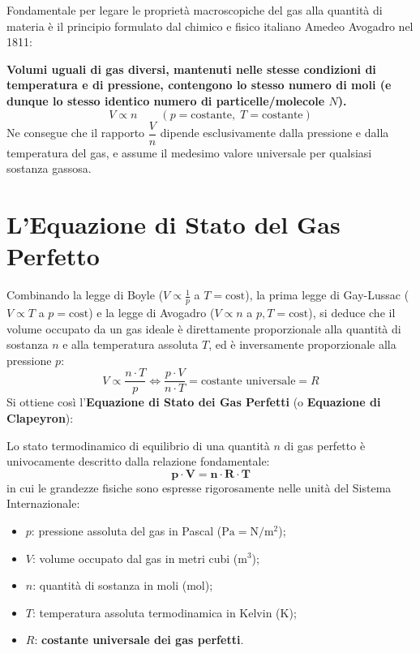 \documentclass[11pt,a4paper,oneside]{report}
\begin{document}
Fondamentale per legare le propriet\`a macroscopiche del gas alla quantit\`a di materia \`e il principio formulato dal chimico e fisico italiano Amedeo Avogadro nel 1811:

\begin{leggefisica}
\textbf{Volumi uguali di gas diversi, mantenuti nelle stesse condizioni di temperatura e di pressione, contengono lo stesso numero di moli (e dunque lo stesso identico numero di particelle/molecole $N$).}
\[
V \propto n \qquad (p = \text{costante}, \; T = \text{costante})
\]
Ne consegue che il rapporto $\dfrac{V}{n}$ dipende esclusivamente dalla pressione e dalla temperatura del gas, e assume il medesimo valore universale per qualsiasi sostanza gassosa.
\end{leggefisica}

\section{L'Equazione di Stato del Gas Perfetto}

Combinando la legge di Boyle ($V \propto \frac{1}{p}$ a $T=\text{cost}$), la prima legge di Gay-Lussac ($V \propto T$ a $p=\text{cost}$) e la legge di Avogadro ($V \propto n$ a $p,T=\text{cost}$), si deduce che il volume occupato da un gas ideale \`e direttamente proporzionale alla quantit\`a di sostanza $n$ e alla temperatura assoluta $T$, ed \`e inversamente proporzionale alla pressione $p$:
\[
V \propto \frac{n \cdot T}{p} \iff \frac{p \cdot V}{n \cdot T} = \text{costante universale} = R
\]
Si ottiene cos\`i l'\textbf{Equazione di Stato dei Gas Perfetti} (o \textbf{Equazione di Clapeyron}):

\begin{definizione}
Lo stato termodinamico di equilibrio di una quantit\`a $n$ di gas perfetto \`e univocamente descritto dalla relazione fondamentale:
\begin{equation}
\bm{p \cdot V = n \cdot R \cdot T}
\label{eq:stato_gas_perfetto}
\end{equation}
in cui le grandezze fisiche sono espresse rigorosamente nelle unit\`a del Sistema Internazionale:
\begin{itemize}
  \item $p$: pressione assoluta del gas in Pascal ($\text{Pa} = \text{N}/\text{m}^2$);
  \item $V$: volume occupato dal gas in metri cubi ($\text{m}^3$);
  \item $n$: quantit\`a di sostanza in moli ($\text{mol}$);
  \item $T$: temperatura assoluta termodinamica in Kelvin ($\text{K}$);
  \item $R$: \textbf{costante universale dei gas perfetti}.
\end{itemize}
\end{definizione}
\end{document}
